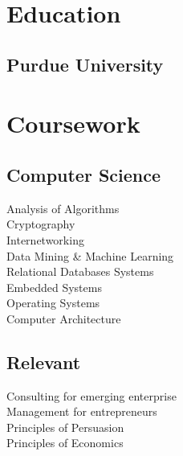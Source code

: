 \documentclass[]{deedy-resume-openfont}
\begin{document}
%
%



%
%

\begin{minipage}[t]{0.33\textwidth} 


\section{Education} 

\subsection{Purdue University}
\sectionsep


\sectionsep


\section{Coursework}
\subsection{Computer Science}
Analysis of Algorithms \\
Cryptography \\
Internetworking \\
Data Mining \& Machine Learning \\
Relational Databases Systems \\
Embedded Systems \\
Operating Systems \\
Computer Architecture \\
\sectionsep

\subsection{Relevant}
Consulting for emerging enterprise \\
Management for entrepreneurs \\
Principles of Persuasion \\
Principles of Economics \\
\sectionsep


\end{minipage}
\end{document}
